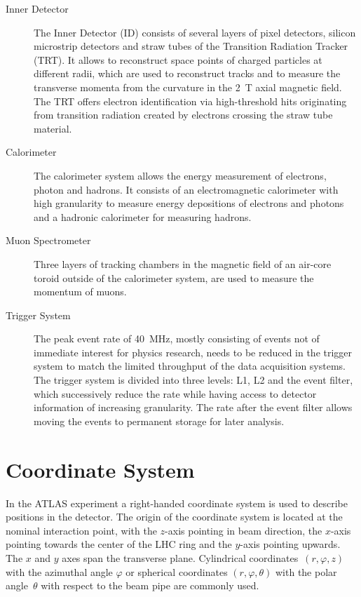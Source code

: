 \begin{description}
\item[Inner Detector] The Inner Detector (ID) consists of several layers of
  pixel detectors, silicon microstrip detectors and straw tubes of the
  Transition Radiation Tracker (TRT). It allows to reconstruct space points of
  charged particles at different radii, which are used to reconstruct tracks and
  to measure the transverse momenta from the curvature in the \SI{2}{\tesla}
  axial magnetic field. The TRT offers electron identification via
  high-threshold hits originating from transition radiation created by electrons
  crossing the straw tube material.

\item[Calorimeter] The calorimeter system allows the energy measurement of
  electrons, photon and hadrons. It consists of an electromagnetic calorimeter
  with high granularity to measure energy depositions of electrons and photons
  and a hadronic calorimeter for measuring hadrons.

\item[Muon Spectrometer] Three layers of tracking chambers in the magnetic field
  of an air-core toroid outside of the calorimeter system, are used to measure
  the momentum of muons.

\item[Trigger System] The peak event rate of \SI{40}{\mega\hertz}, mostly
  consisting of events not of immediate interest for physics research, needs to
  be reduced in the trigger system to match the limited throughput of the data
  acquisition systems. The trigger system is divided into three levels: L1, L2
  and the event filter, which successively reduce the rate while having access
  to detector information of increasing granularity. The rate after the event
  filter allows moving the events to permanent storage for later analysis.
\end{description}


\section{Coordinate System}
\label{sec:atlas_coord_sys}

In the ATLAS experiment a right-handed coordinate system is used to describe
positions in the detector. The origin of the coordinate system is located at the
nominal interaction point, with the $z$-axis pointing in beam direction, the
$x$-axis pointing towards the center of the LHC ring and the $y$-axis pointing
upwards. The $x$ and $y$ axes span the transverse plane. Cylindrical
coordinates~$(r, \varphi, z)$ with the azimuthal angle $\varphi$ or spherical
coordinates $(r, \varphi, \theta)$ with the polar angle~$\theta$ with respect to
the beam pipe are commonly used.

